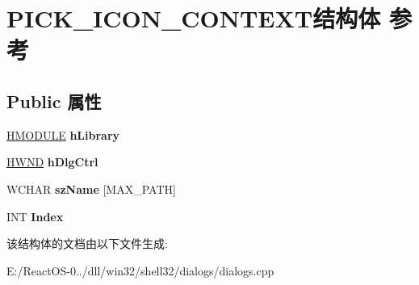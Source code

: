 \hypertarget{struct_p_i_c_k___i_c_o_n___c_o_n_t_e_x_t}{}\section{P\+I\+C\+K\+\_\+\+I\+C\+O\+N\+\_\+\+C\+O\+N\+T\+E\+X\+T结构体 参考}
\label{struct_p_i_c_k___i_c_o_n___c_o_n_t_e_x_t}
\subsection*{Public 属性}
\begin{DoxyCompactItemize}
\item 
\mbox{\label{struct_p_i_c_k___i_c_o_n___c_o_n_t_e_x_t_a6a07cd7a792e526ee3c012b3d69c211b}} 
\hyperlink{interfacevoid}{H\+M\+O\+D\+U\+LE} {\bfseries h\+Library}
\item 
\mbox{\label{struct_p_i_c_k___i_c_o_n___c_o_n_t_e_x_t_aef87685eb5ac8471d075c4d160a9e3f7}} 
\hyperlink{interfacevoid}{H\+W\+ND} {\bfseries h\+Dlg\+Ctrl}
\item 
\mbox{\label{struct_p_i_c_k___i_c_o_n___c_o_n_t_e_x_t_a33439b361c493a4876fe884f0da8e19c}} 
W\+C\+H\+AR {\bfseries sz\+Name} \mbox{[}M\+A\+X\+\_\+\+P\+A\+TH\mbox{]}
\item 
\mbox{\label{struct_p_i_c_k___i_c_o_n___c_o_n_t_e_x_t_a2924b7e6e2fb742f41a90697f8e31a75}} 
I\+NT {\bfseries Index}
\end{DoxyCompactItemize}


该结构体的文档由以下文件生成\+:\begin{DoxyCompactItemize}
\item 
E\+:/\+React\+O\+S-\/0../dll/win32/shell32/dialogs/dialogs.\+cpp\end{DoxyCompactItemize}
